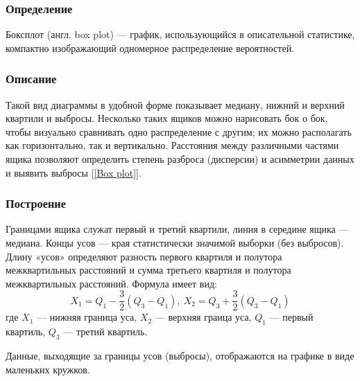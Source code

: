 \documentclass[12pt,a4paper]{article}
\begin{document}
		\subsubsection{Определение}
			Боксплот (англ. box plot) --- график, использующийся в описательной статистике, компактно изображающий одномерное распределение вероятностей.
		
		\subsubsection{Описание}
			Такой вид диаграммы в удобной форме показывает медиану, нижний и верхний квартили и выбросы. Несколько таких ящиков можно нарисовать бок о бок, чтобы визуально сравнивать одно распределение с другим; их можно располагать как горизонтально, так и вертикально. Расстояния между различными частями ящика позволяют определить степень разброса (дисперсии) и асимметрии данных и выявить выбросы [\ref{Box plot}].
		
		\subsubsection{Построение}
			Границами ящика служат первый и третий квартили, линия в середине
			ящика --- медиана. Концы усов — края статистически значимой выборки
			(без выбросов). Длину «усов» определяют разность первого квартиля и полутора межквартильных расстояний и сумма третьего квартиля и полутора
			межквартильных расстояний. Формула имеет вид:
			\begin{equation}\label{eqn:box_plot}
			X_1 = Q_1 - \frac{3}{2}(Q_3 - Q_1),\  X_2 = Q_3 + \frac{3}{2}(Q_3 - Q_1)
			\end{equation}
			где $X_1$ --- нижняя граница уса, $X_2$ --- верхняя граица уса, $Q_1$ --- первый квартиль, $Q_3$ --- третий квартиль.
			
			Данные, выходящие за границы усов (выбросы), отображаются на графике
			в виде маленьких кружков.
	
\end{document}
